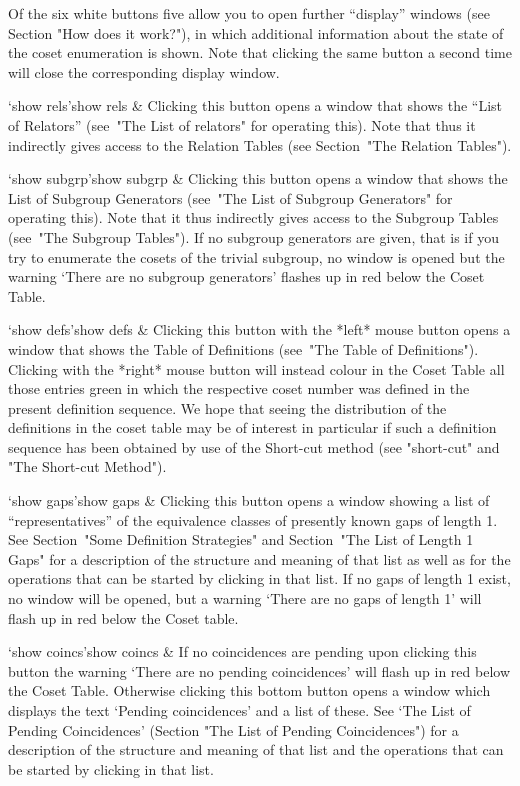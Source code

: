 Of the six white buttons five allow you to open further ``display''
windows (see Section "How does it work?"), in which additional
information about the state of the coset enumeration is shown. Note
that clicking the same button a second time will close the
corresponding display window.

\beginitems

\>`show rels'{show rels} &
  Clicking this button opens a window that shows the ``List of Relators''
  (see~"The List of relators" for operating this). Note that thus it
  indirectly gives access to the Relation Tables (see Section~"The
  Relation Tables").

\>`show subgrp'{show subgrp} &
  Clicking this button opens a window that shows the List of Subgroup
  Generators (see~"The List of Subgroup Generators" for operating this).
  Note that it thus indirectly gives access to the Subgroup Tables
  (see~"The Subgroup Tables"). If no subgroup generators are given, that
  is if you try to enumerate the cosets of the trivial subgroup, no window
  is opened but the warning `There are no subgroup generators' flashes
  up in red below the Coset Table.

\>`show defs'{show defs} &
  Clicking this button with the *left* mouse button opens a window that
  shows the Table of Definitions (see~"The Table of Definitions").
  Clicking with the *right* mouse button will instead colour in the
  Coset Table all those entries green in which the respective coset
  number was defined in the present definition sequence. We hope that
  seeing the distribution of the definitions in the coset table may be
  of interest in particular if such a definition sequence has been
  obtained by use of the Short-cut method (see "short-cut" and "The
  Short-cut Method").

\>`show gaps'{show gaps} &
  Clicking this button opens a window showing a list of
  ``representatives'' of the equivalence classes of presently known gaps
  of length 1. See Section~"Some Definition Strategies" and
  Section~"The List of Length 1 Gaps" for a description of the structure
  and meaning of that list as well as for the operations that can be
  started by clicking in that list. If no gaps of length 1 exist, no
  window will be opened, but a warning `There are no gaps of length 1'
  will flash up in red below the Coset table.


\>`show coincs'{show coincs} &
  If no coincidences are pending upon clicking this button the warning
  `There are no pending coincidences' will flash up in red below the
  Coset Table. Otherwise clicking this bottom button opens a window
  which displays the text `Pending coincidences' and a list of these.
  See `The List of Pending Coincidences' (Section "The List of Pending
  Coincidences") for a description of the structure and meaning of that
  list and the operations that can be started by clicking in that list.

